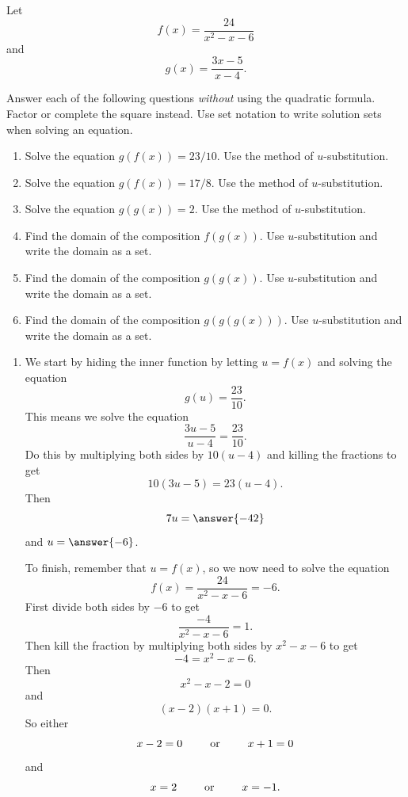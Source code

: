 \documentclass{ximera}
\begin{document}
\begin{example}  \label{Ex0:Comp55}
Let
\[
    f(x) = \frac{24}{x^2-x-6}
\]
and 
\[
    g(x) = \frac{3x-5}{x-4} .
\]


Answer each of the following questions \emph{without} using the quadratic formula. Factor or complete the square instead. Use set notation to write solution sets when solving an equation.
\begin{enumerate}

\item Solve the equation $g(f(x))=23/10$. Use the method of $u$-substitution.

\item Solve the equation $g(f(x)) = 17/8$. Use the method of $u$-substitution.

\item Solve the equation $g(g(x)) = 2$. Use the method of $u$-substitution.

\item Find the domain of the composition $f(g(x))$. Use $u$-substitution and write the domain as a set.

\item Find the domain of the composition $g(g(x))$. Use $u$-substitution and write the domain as a set.

\item Find the domain of the composition $g(g(g(x)))$. Use $u$-substitution and write the domain as a set.
\end{enumerate}

\begin{explanation}
\begin{enumerate}
\item We start by hiding the inner function by letting $u=f(x)$ and solving the equation
\[
     g(u) = \frac{23}{10}. 
\]
This means we solve the equation
\[
        \frac{3u-5}{u-4} = \frac{23}{10} .
\]
Do this by multiplying both sides by $10(u-4)$ and killing the fractions to get
\[
       10 (3u-5) = 23 (u-4) .
\]
Then 
\[
      7u = \answer{-42}
\]
and $u=\answer{-6}$. 

To finish, remember that $u=f(x)$, so we now need to solve the equation
\[
      f(x) = \frac{24}{x^2-x-6} = -6.
\]  
First divide both sides by $-6$ to get
\[
      \frac{-4}{x^2-x-6} = 1.
\] 
Then kill the fraction by multiplying both sides by $x^2 - x - 6$ to get
\[
      -4 = x^2 - x - 6 .
\]
Then
\[
    x^2 - x -2 = 0
\]
and
\[
     (x-2)(x+1) = 0.
\] 
So either
\[
   x - 2 = 0 \hskip 0.3 in \text{ or } \hskip 0.3in x+1 = 0
\]
and
\[
 x = 2 \hskip 0.3 in \text{ or } \hskip 0.3in x = -1.
\]


\end{enumerate}
\end{explanation}
\end{example}
\end{document}
